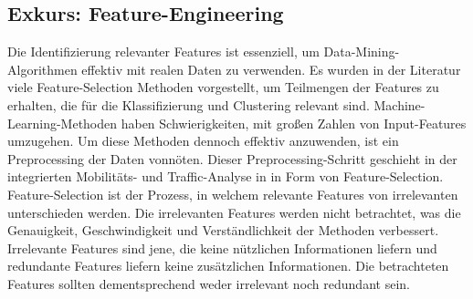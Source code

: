 \documentclass[12pt, a4paper]{article}
\begin{document}
\subsection{Exkurs: Feature-Engineering}
Die Identifizierung relevanter Features ist essenziell, um Data-Mining-Algorithmen effektiv mit realen Daten zu verwenden.
Es wurden in der Literatur viele Feature-Selection Methoden vorgestellt, um Teilmengen der Features zu erhalten,
die für die Klassifizierung und Clustering relevant sind.
Machine-Learning-Methoden haben Schwierigkeiten, mit großen Zahlen von Input-Features
umzugehen. Um diese Methoden dennoch effektiv anzuwenden, ist ein Preprocessing der Daten vonnöten. \cite{Kumar2014}
Dieser Preprocessing-Schritt geschieht in der integrierten Mobilitäts- und Traffic-Analyse in \cite{Alipour2018} in
Form von Feature-Selection. Feature-Selection ist der Prozess, in welchem relevante Features von irrelevanten unterschieden
werden. Die irrelevanten Features werden nicht betrachtet, was die Genauigkeit, Geschwindigkeit und Verständlichkeit 
der Methoden verbessert. Irrelevante Features sind jene, die keine nützlichen Informationen liefern und redundante Features
liefern keine zusätzlichen Informationen. \cite{Kumar2014} Die betrachteten Features sollten dementsprechend weder
irrelevant noch redundant sein.
\end{document}
